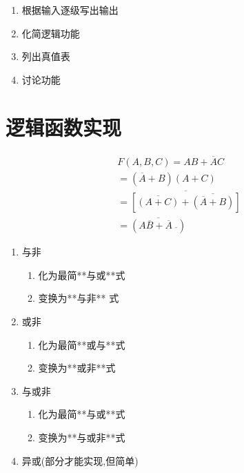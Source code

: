 \newpage

\begin{enumerate}

    \item 根据输入逐级写出输出
    \item 化简逻辑功能
    \item 列出真值表
    \item 讨论功能

\end{enumerate}

\section{逻辑函数实现}

\begin{equation}
    \begin{aligned}
        F(A,B,C)=AB+\overline{A}C                                             \\
        =(\overline{A}+B)(A+C)                                                \\
        =\overline{\left[\overline{(A+C)}+\overline{(\overline{A}+B)}\right]} \\
        =\overline{(A\overline{B}+\overline{A}~\overline{})}
    \end{aligned}
\end{equation}

\newpage

\begin{enumerate}

    \item 与非

          \begin{enumerate}

              \item 化为最简**与或**式
              \item 变换为**与非** 式

          \end{enumerate}

    \item 或非

          \begin{enumerate}

              \item 化为最简**或与**式
              \item 变换为**或非**式

          \end{enumerate}


    \item 与或非

          \begin{enumerate}

              \item 化为最简**与或**式
              \item 变换为**与或非**式

          \end{enumerate}

    \item 异或(部分才能实现,但简单)

\end{enumerate}

